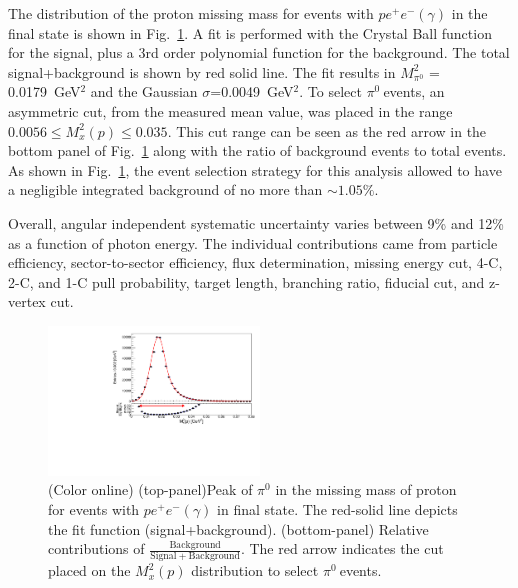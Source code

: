 \documentclass[aps,prc,twocolumn,floatfix,showpacs,preprintnumbers,amsmath,amssymb,superscriptaddress]{revtex4-1}
\def\pizT{$\pi^{0} \ $}
\begin{document}
The distribution of the proton missing mass for events
with $pe^+e^-(\gamma)$ in the final state is shown in 
Fig.~\ref{fig:pi0_peak}. A fit is performed with the Crystal Ball 
function~\cite{Ball1,Ball2} for the signal, plus a 3rd 
order polynomial function for the background. The total signal+background is shown by red solid line. The fit results in $M_{\pi^0}^2$ = 
0.0179~GeV$^2$ and the Gaussian $\sigma$=0.0049~GeV$^2$. To select \pizT events, 
an asymmetric cut, from the measured mean value, was placed in the range $0.0056 \le  M_x^2(p) \le 0.035$. This cut range can be seen as the red arrow in the bottom panel of Fig.~\ref{fig:pi0_peak} along with the ratio of background events to total events.
As shown in Fig.~\ref{fig:pi0_peak}, the event selection strategy for this analysis allowed to have a negligible integrated background of no more than $\sim1.05\%$.

Overall, angular independent systematic uncertainty varies 
between 9\% and 12\% as a function of photon energy. The 
individual contributions came from particle efficiency, 
sector-to-sector efficiency, flux determination, missing energy cut, 
4-C, 2-C, and 1-C pull probability, target length, branching 
ratio, fiducial cut, and z-vertex cut.
\begin{figure}[htb!]
\centerline{
        \includegraphics[height=0.4\textwidth,width=0.5\textwidth]{G12_Pi0_wBck.pdf}}

        \caption {(Color online) (top-panel)Peak of $\pi^0$ in the missing
                mass of proton for events with $pe^+e^-(\gamma)$
                in final state. The red-solid line depicts the fit function (signal+background).
                (bottom-panel) Relative contributions of $\frac{\mathrm{Background}}{\mathrm{Signal + Background}}$. The red arrow indicates the cut placed on the $M_x^2(p)$ distribution to select \pizT events.} \label{fig:pi0_peak}
\end{figure}
\end{document}
